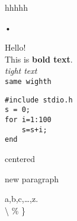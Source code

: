 \documentclass[12pt]{article}
\begin{document}
\begin{center}
\large hhhhh
\end{center}•



Hello!\\
This is \textbf{bold text}.\\
\textit{tight text}\\
\texttt{same wighth}

\begin{verbatim}
#include stdio.h
s = 0;
for i=1:100
    s=s+i;
end
\end{verbatim}

\begin	{center}
centered
\end{center}

new paragraph

a,b,c,\ldots,z.\\
\textbackslash  %
 \% \}
 
\end{document}
